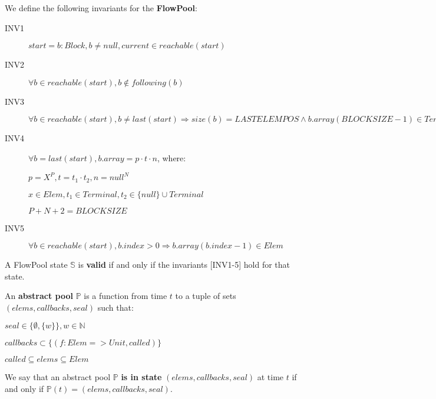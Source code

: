 \documentclass[runningheads,a4paper]{llncs}
\begin{document}
\begin{definition}[Invariants]
We define the following invariants for the \textbf{FlowPool}:
\begin{description}
\item[INV1] $start = b: Block, b \neq null, current \in reachable(start)$
\item[INV2] $\forall b \in reachable(start), b \not \in following(b)$
\item[INV3] $\forall b \in reachable(start), b \neq last(start) \Rightarrow size(b) = LASTELEMPOS \wedge b.array(BLOCKSIZE - 1) \in Terminal$
\item[INV4]
$\forall b = last(start), b.array = p \cdot t \cdot n$, where:

$p = X^P, t = t_1 \cdot t_2, n = null^N$

$x \in Elem, t_1 \in Terminal, t_2 \in \{null\} \cup Terminal$

$P + N + 2 = BLOCKSIZE$
\item[INV5] $\forall b \in reachable(start), b.index > 0 \Rightarrow b.array(b.index - 1) \in Elem$
\end{description}
\end{definition}


\begin{definition}[Validity]
A FlowPool state $\mathbb{S}$ is \textbf{valid} if and only if the invariants [INV1-5] hold for that state.
\end{definition}


\begin{definition}
An \textbf{abstract pool} $\mathbb{P}$ is a function from time $t$ to a tuple of sets $(elems, callbacks, seal)$ such that:
\begin{description}
\item $seal \in \{ \emptyset, \{ w \} \}, w \in \mathbb{N}$
\item $callbacks \subset \{ (f: Elem => Unit, called) \}$
\item $called \subseteq elems \subseteq Elem$
\end{description}
We say that an abstract pool $\mathbb{P}$ \textbf{is in state} $(elems, callbacks, seal)$ at time $t$ if and only if $\mathbb{P}(t) = (elems, callbacks, seal)$.
\end{definition}
\end{document}
